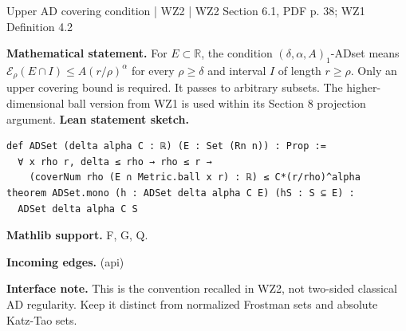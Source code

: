 \documentclass[10pt,a4paper]{article}
\newcommand{\nodecard}[1]{\hyperlink{node-#1}{\texttt{\detokenize{#1}}}}
\begin{document}
\begin{minipage}{\linewidth}
\hypertarget{node-DAD}{}
\begin{tcolorbox}[colback=white,colframe=grainsfg,colbacktitle=grainsbg,coltitle=ink,boxrule=0.45pt,arc=1.6mm,left=3mm,right=3mm,top=2mm,bottom=2mm,title={\sffamily\bfseries WZ2 Section 6.1: ADset \hfill \texttt{DAD}}]
{\sffamily\small\color{muted}Upper AD covering condition | WZ2 | WZ2 Section 6.1, PDF p. 38; WZ1 Definition 4.2}\par
\textbf{Mathematical statement.} For $E\subset\mathbb R$, the condition $(\delta,\alpha,A)_1$-ADset means
$\mathcal E_\rho(E\cap I)\le A(r/\rho)^\alpha$ for every $\rho\ge\delta$ and interval $I$ of length $r\ge\rho$.
Only an upper covering bound is required. It passes to arbitrary subsets.
The higher-dimensional ball version from WZ1 is used within its Section 8 projection argument.
\smallskip\textbf{Lean statement sketch.}
\begin{Verbatim}[fontsize=\small,breaklines=true,breakanywhere=true,tabsize=2]
def ADSet (delta alpha C : ℝ) (E : Set (Rn n)) : Prop :=
  ∀ x rho r, delta ≤ rho → rho ≤ r →
    (coverNum rho (E ∩ Metric.ball x r) : ℝ) ≤ C*(r/rho)^alpha
theorem ADSet.mono (h : ADSet delta alpha C E) (hS : S ⊆ E) :
  ADSet delta alpha C S
\end{Verbatim}
{\footnotesize\textbf{Mathlib support.} F, G, Q.\par
\textbf{Incoming edges.} \nodecard{Ientropy} (api)\par}
{\footnotesize\textbf{Interface note.} This is the convention recalled in WZ2, not two-sided classical AD regularity. Keep it distinct from normalized Frostman sets and absolute Katz-Tao sets.}
\end{tcolorbox}\end{minipage}\par\medskip
\end{document}
